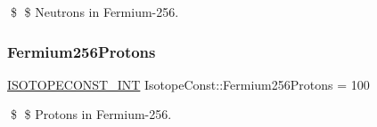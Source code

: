 \$ \$ Neutrons in Fermium-\/256. \mbox{\label{group___isotope_const-_fermium-_fm256_ga5e5674d506414e7aa1471b749267ea2b}} 
\subsubsection{\texorpdfstring{Fermium256\+Protons}{Fermium256Protons}}
{\footnotesize\ttfamily \mbox{\hyperlink{group___isotope_const-_macros_ga5f18360b3e99483a35c32d789e62621c}{I\+S\+O\+T\+O\+P\+E\+C\+O\+N\+S\+T\+\_\+\+I\+NT}} Isotope\+Const\+::\+Fermium256\+Protons = 100}

\$ \$ Protons in Fermium-\/256. 